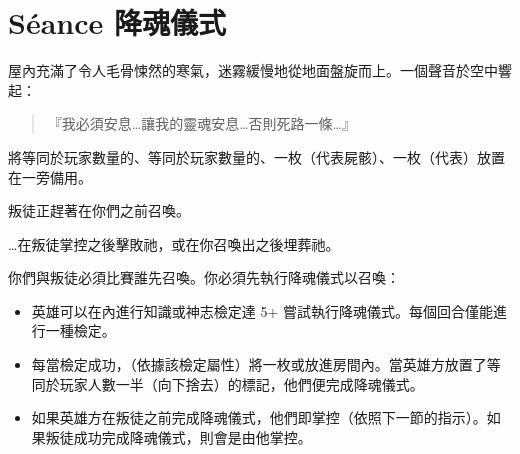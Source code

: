 
\chapter{Séance 降魂儀式}

\begin{HauntStory}
  屋內充滿了令人毛骨悚然的寒氣，迷霧緩慢地從地面盤旋而上。一個聲音於空中響起：
  \begin{quote}
    『我必須安息…讓我的靈魂安息…否則死路一條…』
  \end{quote}
\end{HauntStory}

將等同於玩家數量的、等同於玩家數量的、一枚（代表屍骸）、一枚（代表）放置在一旁備用。

叛徒正趕著在你們之前召喚。

…在叛徒掌控之後擊敗祂，或在你召喚出之後埋葬祂。

你們與叛徒必須比賽誰先召喚。你必須先執行降魂儀式以召喚：
\begin{itemize}
  \item 英雄可以在內進行知識或神志檢定達 5+ 嘗試執行降魂儀式。每個回合僅能進行一種檢定。
  \item 每當檢定成功，（依據該檢定屬性）將一枚或放進房間內。當英雄方放置了等同於玩家人數一半（向下捨去）的標記，他們便完成降魂儀式。
  \item 如果英雄方在叛徒之前完成降魂儀式，他們即掌控（依照下一節的指示）。如果叛徒成功完成降魂儀式，則會是由他掌控。
\end{itemize}

\vfill\null\pagebreak


